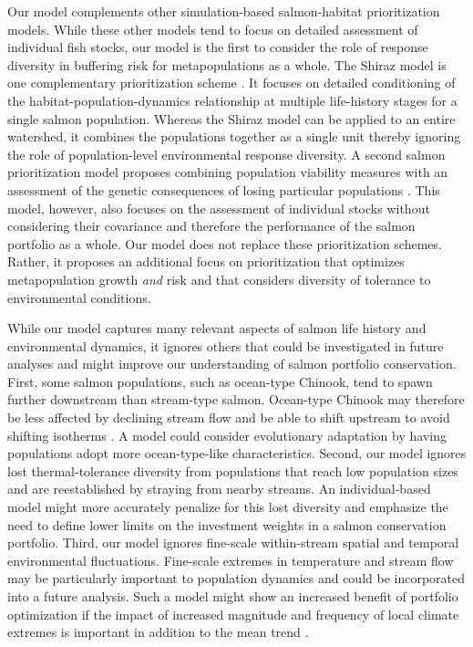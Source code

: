 \documentclass[12pt,english]{article}
\begin{document}
\begin{spacing}{1.3}
Our model complements other simulation-based salmon-habitat prioritization models. While these other models tend to focus on detailed assessment of individual fish stocks, our model is the first to consider the role of response diversity in buffering risk for metapopulations as a whole. The Shiraz model is one complementary prioritization scheme \citep{scheuerell2006}. It focuses on detailed conditioning of the habitat-population-dynamics relationship at multiple life-history stages for a single salmon population. Whereas the Shiraz model can be applied to an entire watershed, it combines the populations together as a single unit thereby ignoring the role of population-level environmental response diversity. A second salmon prioritization model proposes combining population viability measures with an assessment of the genetic consequences of losing particular populations \citep{allendorf1997}. This model, however, also focuses on the assessment of individual stocks without considering their covariance and therefore the performance of the salmon portfolio as a whole. Our model does not replace these prioritization schemes. Rather, it proposes an additional focus on prioritization that optimizes metapopulation growth \emph{and} risk and that considers diversity of tolerance to environmental conditions.

While our model captures many relevant aspects of salmon life history and environmental dynamics, it ignores others that could be investigated in future analyses and might improve our understanding of salmon portfolio conservation. First, some salmon populations, such as ocean-type Chinook, tend to spawn further downstream than stream-type salmon. Ocean-type Chinook may therefore be less affected by declining stream flow and be able to shift upstream to avoid shifting isotherms \citep{mantua2010}. A model could consider evolutionary adaptation by having populations adopt more ocean-type-like characteristics. Second, our model ignores lost thermal-tolerance diversity from populations that reach low population sizes and are reestablished by straying from nearby streams. An individual-based model might more accurately penalize for this lost diversity and emphasize the need to define lower limits on the investment weights in a salmon conservation portfolio. Third, our model ignores fine-scale within-stream spatial and temporal environmental fluctuations. Fine-scale extremes in temperature and stream flow may be particularly important to population dynamics \citep{mantua2010} and could be incorporated into a future analysis. Such a model might show an increased benefit of portfolio optimization if the impact of increased magnitude and frequency of local climate extremes is important in addition to the mean trend \citep{jentsch2007}.


\end{spacing}
\end{document}
